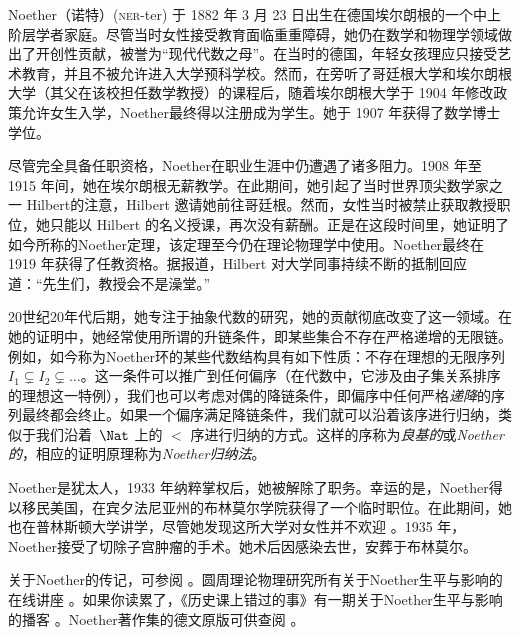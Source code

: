 \documentclass[../../../include/open-logic-section]{subfiles}
\begin{document}



Noether（诺特）(\textsc{ner}-ter) 于 1882 年 3 月 23 日出生在德国埃尔朗根的一个中上阶层学者家庭。尽管当时女性接受教育面临重重障碍，她仍在数学和物理学领域做出了开创性贡献，被誉为“现代代数之母”。在当时的德国，年轻女孩理应只接受艺术教育，并且不被允许进入大学预科学校。然而，在旁听了哥廷根大学和埃尔朗根大学（其父在该校担任数学教授）的课程后，随着埃尔朗根大学于 1904 年修改政策允许女生入学，Noether最终得以注册成为学生。她于 1907 年获得了数学博士学位。

尽管完全具备任职资格，Noether在职业生涯中仍遭遇了诸多阻力。1908 年至 1915 年间，她在埃尔朗根无薪教学。在此期间，她引起了当时世界顶尖数学家之一 Hilbert的注意，Hilbert 邀请她前往哥廷根。然而，女性当时被禁止获取教授职位，她只能以 Hilbert 的名义授课，再次没有薪酬。正是在这段时间里，她证明了如今所称的Noether定理，该定理至今仍在理论物理学中使用。Noether最终在 1919 年获得了任教资格。据报道，Hilbert 对大学同事持续不断的抵制回应道：“先生们，教授会不是澡堂。”

20世纪20年代后期，她专注于抽象代数的研究，她的贡献彻底改变了这一领域。在她的证明中，她经常使用所谓的升链条件，即某些集合不存在严格递增的无限链。例如，如今称为Noether环的某些代数结构具有如下性质：不存在理想的无限序列 $I_1 \subsetneq I_2 \subsetneq \dots$。这一条件可以推广到任何偏序（在代数中，它涉及由子集关系排序的理想这一特例），我们也可以考虑对偶的降链条件，即偏序中任何严格\emph{递降}的序列最终都会终止。如果一个偏序满足降链条件，我们就可以沿着该序进行归纳，类似于我们沿着~$\Nat$ 上的 $<$ 序进行归纳的方式。这样的序称为\emph{良基的}或\emph{Noether的}，相应的证明原理称为\emph{Noether归纳法}。

Noether是犹太人，1933 年纳粹掌权后，她被解除了职务。幸运的是，Noether得以移民美国，在宾夕法尼亚州的布林莫尔学院获得了一个临时职位。在此期间，她也在普林斯顿大学讲学，尽管她发现这所大学对女性并不欢迎 \citep[81]{Dick1981}。1935 年，Noether接受了切除子宫肿瘤的手术。她术后因感染去世，安葬于布林莫尔。

\begin{reading}
关于Noether的传记，可参阅 \citet{Dick1981}。圆周理论物理研究所有关于Noether生平与影响的在线讲座 \citep{Perimeter2015}。如果你读累了，《历史课上错过的事》有一期关于Noether生平与影响的播客 \citep{Frey2015}。Noether著作集的德文原版可供查阅 \citep{Noether1983}。
\end{reading}
\end{document}
